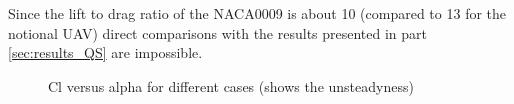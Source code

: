 
Since the lift to drag ratio of the NACA0009 is about 10 (compared to 13 for the notional UAV) direct comparisons with the results presented in part \ref{sec:results_QS} are impossible.
\begin{figure}[ht]
  \begin{center}
  \end{center}
  \caption{Cl versus alpha for different cases (shows the unsteadyness)}
  \label{fig:Cl_vs_alpha_optimization}
\end{figure}


